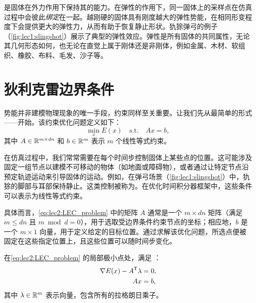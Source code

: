 \begin{remark}[弹性]
  \label{rem:lec2:elasticity}
  是固体在外力作用下保持其的能力。在弹性的作用下，同一固体上的采样点在仿真过程中会彼此\emph{绑定}在一起。越刚硬的固体具有刚度越大的弹性势能，在相同形变程度下会提供更大的弹性力，从而有助于恢复静止形状。犰狳弹弓的例子（\cref{fig:lec1:slingshot}）展示了典型的弹性效应。弹性是所有固体的共同属性，无论其几何形态如何，也无论在直觉上属于刚体还是非刚体，例如金属、木材、软组织、橡胶、布料、毛发、沙子等。
\end{remark}

\section{狄利克雷边界条件}
\label{sec:dirichlet-bc}

势能并非建模物理现象的唯一手段，约束同样至关重要。让我们先从最简单的形式——开始。该约束优化问题定义如下：
\begin{equation}
  \label{eq:lec2:LEC_problem}
  \min_{x} E(x) \quad \text{s.t.} \quad Ax = b,
\end{equation}
其中 $A \in \mathbb{R}^{m \times dn}$ 和 $b \in \mathbb{R}^{m}$ 表示 $m$ 个线性等式约束。

在仿真过程中，我们常常需要在每个时间步控制固体上某些点的位置。这可能涉及固定一组节点以建模不可移动的物体（如地面或障碍物），或者通过让特定节点沿预定轨迹运动来引导固体的运动。例如，在弹弓场景（\cref{fig:lec1:slingshot}）中，犰狳的脚部与耳部保持静止。这类控制被称为。在优化时间积分器框架中，这些条件可以表示为线性等式约束。

具体而言，\cref{eq:lec2:LEC_problem} 中的矩阵 $A$ 通常是一个 $m \times dn$ 矩阵（满足 $m \le dn$ 且 $m \bmod d = 0$），用于选取受边界条件约束节点的坐标；相应地，$b$ 是一个 $m \times 1$ 向量，用于定义给定的目标位置。通过求解该优化问题，所选点便被固定在这些指定位置上，且这些位置可以随时间步变化。

在\cref{eq:lec2:LEC_problem} 的局部极小点处，满足 ：
\begin{equation}
  \label{eq:lec2:LEC_KKT}
  \begin{aligned}
    \nabla E(x) - A^{\mathsf{T}} \lambda &= 0, \\
    Ax &= b,
  \end{aligned}
\end{equation}
其中 $\lambda \in \mathbb{R}^m$ 表示向量，包含所有的拉格朗日乘子。

